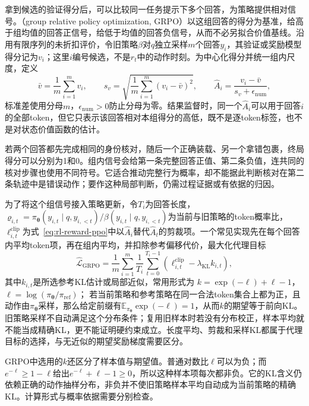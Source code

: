 拿到候选的验证得分后，可以比较同一任务提示下多个回答，为策略提供相对信号。（group relative policy optimization, GRPO）以这组回答的得分为基准，给高于组均值的回答正信号，给低于均值的回答负信号，从而不必另拟合价值基线。沿用有限序列的未折扣评价，令旧策略$\beta$对$q$独立采样$m$个回答$y_i$，其验证或奖励模型得分记为$v_i$；这里$i$编号候选，不是$r_t$中的动作时刻。为中心化得分并统一组内尺度，定义
\begin{equation}
  \bar v=\frac1m\sum_{i=1}^m v_i,\qquad
  s_v=\sqrt{\frac1m\sum_{i=1}^m(v_i-\bar v)^2},\qquad
  \widehat A_i=\frac{v_i-\bar v}{s_v+\epsilon_{\mathrm{num}}},
  \label{eq:rl-reward-grpo-advantage}
\end{equation}
标准差使用分母$m$，$\epsilon_{\mathrm{num}}>0$防止分母为零。结果监督时，同一个$\widehat A_i$可以用于回答$i$的全部token，但它只表示该回答相对本组得分的高低，既不是逐token标签，也不是对状态价值函数的估计。

若两个回答都先完成相同的身份核对，随后一个正确装载、另一个拿错包裹，终局得分可以分别为1和0。组内信号会给第一条完整回答正值、第二条负值，连共同的核对步骤也使用不同符号。它适合推动完整行为概率，却不能据此判断核对在第二条轨迹中是错误动作；要作这种局部判断，仍需过程证据或有依据的归因。

为了将这个组信号接入策略更新，令$T_i$为回答长度，$\varrho_{i,t}=\pi_{\bm{\theta}}(y_{i,t}\mid q,y_{i,<t})/
\beta(y_{i,t}\mid q,y_{i,<t})$为当前与旧策略的token概率比，$\ell_{i,t}^{\mathrm{clip}}$为式~\eqref{eq:rl-reward-ppo}中以$\widehat A_i$替代$\widehat A_t$的剪裁项。一个常见实现先在每个回答内平均token项，再在组内平均，并扣除参考偏移代价，最大化代理目标
\begin{equation}
  \widehat{\mathcal L}_{\mathrm{GRPO}}
  =\frac1m\sum_{i=1}^m\frac1{T_i}
      \sum_{t=0}^{T_i-1}
       \left(\ell_{i,t}^{\mathrm{clip}}-\lambda_{\mathrm{KL}} k_{i,t}\right),
  \label{eq:rl-reward-grpo}
\end{equation}
其中$k_{i,t}$是所选参考KL估计或局部近似，常用形式为
$k=\exp(-\ell)+\ell-1$，$\ell=\log(\pi_{\bm{\theta}}/\pi_{\mathrm{ref}})$；
若当前策略和参考策略在同一合法token集合上都为正，且动作由$\pi_{\bm{\theta}}$采样，那么给定前缀有$\mathbb E_{\pi_{\bm{\theta}}}\exp(-\ell)=1$，从而$k$的期望等于前向KL。旧策略采样不自动满足这个分布条件；复用旧样本时若没有分布校正，样本平均就不能当成精确KL，更不能证明硬约束成立。长度平均、剪裁和采样KL都属于代理目标的选择，与无近似的期望奖励梯度需要区分。

GRPO中选用的$k$还区分了样本值与期望值。普通对数比$\ell$可以为负；而$e^{-\ell}\geq1-\ell$给出$e^{-\ell}+\ell-1\geq0$，所以这种样本项每次都非负。它的KL含义仍依赖正确的动作抽样分布，非负并不使旧策略样本平均自动成为当前策略的精确KL。计算形式与概率依据需要分别检查。


